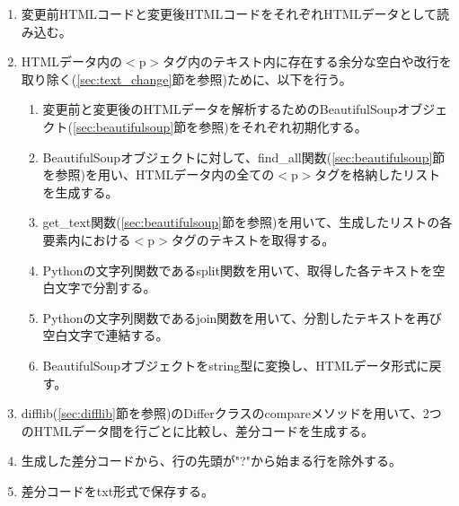 \begin{enumerate}
    \item 変更前HTMLコードと変更後HTMLコードをそれぞれHTMLデータとして読み込む。
    \item HTMLデータ内の$<$p$>$タグ内のテキスト内に存在する余分な空白や改行を取り除く(\ref{sec:text_change}節を参照)ために、以下を行う。
          \begin{enumerate}
              \item 変更前と変更後のHTMLデータを解析するためのBeautifulSoupオブジェクト(\ref{sec:beautifulsoup}節を参照)をそれぞれ初期化する。
              \item BeautifulSoupオブジェクトに対して、find\_all関数(\ref{sec:beautifulsoup}節を参照)を用い、HTMLデータ内の全ての$<$p$>$タグを格納したリストを生成する。
              \item get\_text関数(\ref{sec:beautifulsoup}節を参照)を用いて、生成したリストの各要素内における$<$p$>$タグのテキストを取得する。
              \item Pythonの文字列関数であるsplit関数を用いて、取得した各テキストを空白文字で分割する。
              \item Pythonの文字列関数であるjoin関数を用いて、分割したテキストを再び空白文字で連結する。
              \item BeautifulSoupオブジェクトをstring型に変換し、HTMLデータ形式に戻す。
          \end{enumerate}
    \item difflib(\ref{sec:difflib}節を参照)のDifferクラスのcompareメソッドを用いて、2つのHTMLデータ間を行ごとに比較し、差分コードを生成する。
    \item 生成した差分コードから、行の先頭が"?"から始まる行を除外する。
    \item 差分コードをtxt形式で保存する。
\end{enumerate}



